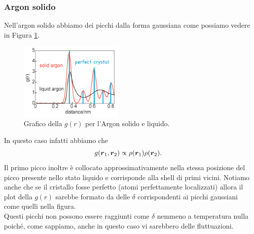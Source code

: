 \subsubsection{Argon solido}
\label{subsubsec:Argon solido}
Nell'argon solido abbiamo dei picchi dalla forma gaussiana come possiamo vedere in Figura \ref{fig:-solid-Argon}. 
\begin{figure}[ht]
	\centering
	\includegraphics[width=0.45\textwidth]{figures/argon-g-solido.png}
	\caption{Grafico della $g(r)$ per l'Argon solido e liquido.}
	\label{fig:-solid-Argon}
\end{figure}
In questo caso infatti abbiamo che 
\[
	g(\boldsymbol{r}_1,\boldsymbol{r}_2) \propto \rho (\boldsymbol{r}_1)\rho (\boldsymbol{r}_2)
.\] 
Il primo picco inoltre è collocato approssimativamente nella stessa posizione del picco presente nello stato liquido e corrisponde alla shell di primi vicini. 
Notiamo anche che se il cristallo fosse perfetto (atomi perfettamente localizzati) allora il plot della $g(r)$ sarebbe formato da delle $\delta$ corrispondenti ai picchi gaussiani come quelli nella figura.\\
Questi picchi non possono essere raggiunti come $\delta$ nemmeno a temperatura nulla poiché, come sappiamo, anche in questo caso vi sarebbero delle fluttuazioni.
